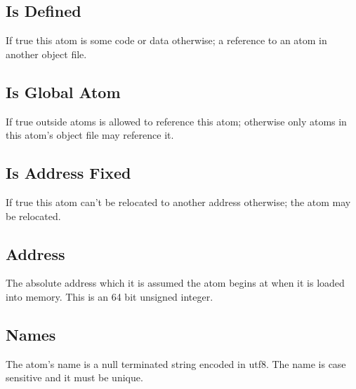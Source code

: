 \subsection{Is Defined}
If true this atom is some code or data otherwise; a reference to an atom in 
another object file.

\subsection{Is Global Atom}
If true outside atoms is allowed to reference this atom; otherwise only atoms in
this atom's object file may reference it.

\subsection{Is Address Fixed}
If true this atom can't be relocated to another address otherwise; the atom may
be relocated.

\subsection{Address}
The absolute address which it is assumed the atom begins at when it is loaded
into memory. This is an 64 bit unsigned integer.

\subsection{Names}
The atom's name is a null terminated string encoded in utf8. The name is case 
sensitive and it must be unique.